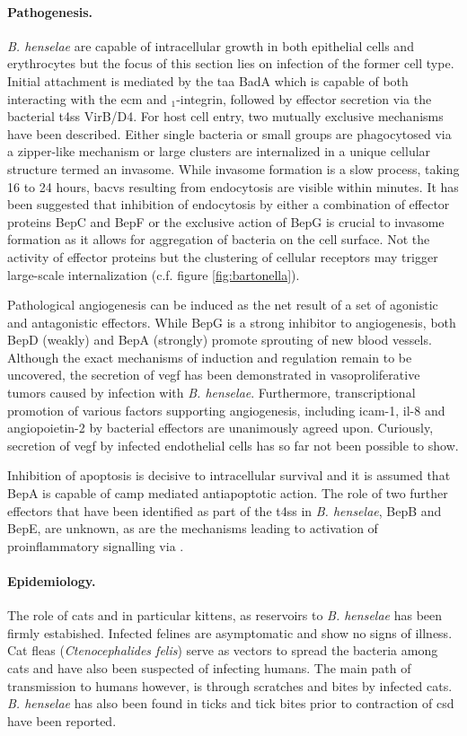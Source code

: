 \paragraph{Pathogenesis.}
\textit{B. henselae} are capable of intracellular growth in both epithelial cells and erythrocytes but the focus of this section lies on infection of the former cell type. Initial attachment is mediated by the \gls{taa} BadA which is capable of both interacting with the \gls{ecm} and \textbeta$_1$-integrin, followed by effector secretion via the bacterial \gls{t4ss} VirB/D4. For host cell entry, two mutually exclusive mechanisms have been described. Either single bacteria or small groups are phagocytosed via a zipper-like mechanism or large clusters are internalized in a unique cellular structure termed an invasome. While invasome formation is a slow process, taking 16 to 24 hours, \glspl{bacv} resulting from endocytosis are visible within minutes. It has been suggested that inhibition of endocytosis by either a combination of effector proteins BepC and BepF or the exclusive action of BepG is crucial to invasome formation as it allows for aggregation of bacteria on the cell surface. Not the activity of effector proteins but the clustering of cellular receptors may trigger large-scale internalization (c.f. figure \ref{fig:bartonella}).

Pathological angiogenesis can be induced as the net result of a set of agonistic and antagonistic effectors. While BepG is a strong inhibitor to angiogenesis, both BepD (weakly) and BepA (strongly) promote sprouting of new blood vessels. Although the exact mechanisms of induction and regulation remain to be uncovered, the secretion of \gls{vegf} has been demonstrated in vasoproliferative tumors caused by infection with \textit{B. henselae}. Furthermore, transcriptional promotion of various factors supporting angiogenesis, including \gls{icam-1}, \gls{il-8} and angiopoietin-2 by bacterial effectors are unanimously agreed upon. Curiously, secretion of \gls{vegf} by infected endothelial cells has so far not been possible to show.

Inhibition of apoptosis is decisive to intracellular survival and it is assumed that BepA is capable of \gls{camp} mediated antiapoptotic action. The role of two further effectors that have been identified as part of the \gls{t4ss} in \textit{B. henselae}, BepB and BepE, are unknown, as are the mechanisms leading to activation of proinflammatory signalling via .

\paragraph{Epidemiology.}
The role of cats and in particular kittens, as reservoirs to \textit{B. henselae} has been firmly estabished. Infected felines are asymptomatic and show no signs of illness. Cat fleas (\textit{Ctenocephalides felis}) serve as vectors to spread the bacteria among cats and have also been suspected of infecting humans. The main path of transmission to humans however, is through scratches and bites by infected cats. \textit{B. henselae} has also been found in ticks and tick bites prior to contraction of \gls{csd} have been reported.

